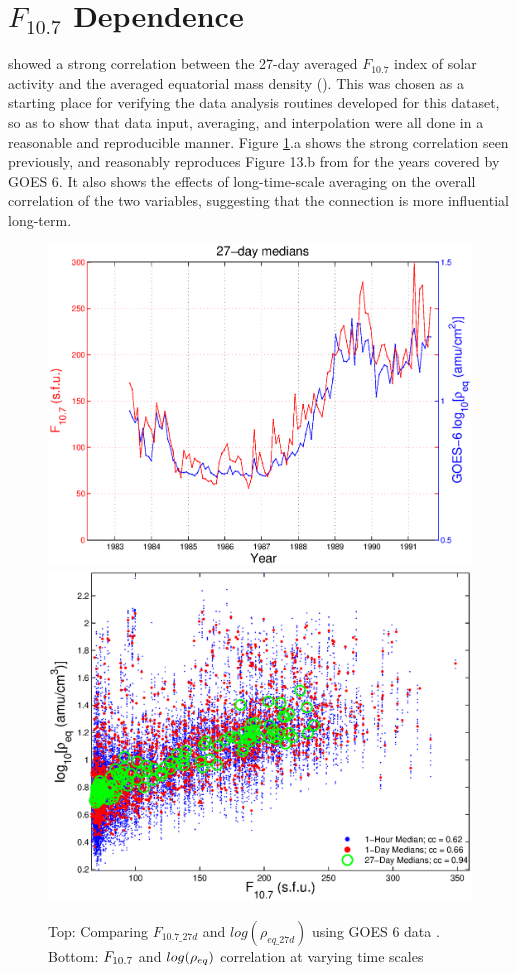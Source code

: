 \section{$F_{10.7}$ Dependence}
\cite{Takahashi2010SolarCycleVariation} showed a strong correlation between the 27-day averaged $F_{10.7}$ index of solar activity and the averaged equatorial mass density (\req). This was chosen as a starting place for verifying the data analysis routines developed for this dataset, so as to show that data input, averaging, and interpolation were all done in a reasonable and reproducible manner. Figure \ref{fig:F107rhoeq27dcomparison}.a shows the strong correlation seen previously, and reasonably reproduces Figure 13.b from \cite{Takahashi2010SolarCycleVariation} for the years covered by GOES 6. It also shows the effects of long-time-scale averaging on the overall correlation of the two variables, suggesting that the connection is more influential long-term.

\begin{figure}[htp!]
	\centering
	\includegraphics[width=0.7\linewidth]{Figures/F107MD27d-GOES6}
	\includegraphics[width=0.7\linewidth]{Figures/ccplot-GOES6}
	\caption{Top: Comparing $F_{10.7\_27d}$ and $log(\rho_{eq\_27d})$ using GOES 6 data . Bottom: $F_{10.7}$ and $log(\rho_{eq})$ correlation at varying time scales}
	\label{fig:F107rhoeq27dcomparison}
\end{figure}

